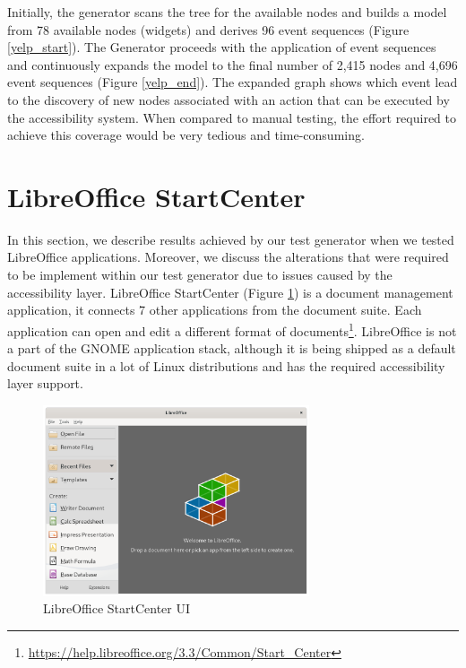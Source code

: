 Initially, the generator scans the tree for the available nodes and builds a model from 78 available nodes (widgets) and derives 96 event sequences (Figure \ref{yelp_start}). The Generator proceeds with the application of event sequences and continuously expands the model to the final number of 2,415 nodes and 4,696 event sequences (Figure \ref{yelp_end}). The expanded graph shows which event lead to the discovery of new nodes associated with an action that can be executed by the accessibility system. When compared to manual testing, the effort required to achieve this coverage would be very tedious and time-consuming. 

\section{LibreOffice StartCenter}
In this section, we describe results achieved by our test generator when we tested LibreOffice applications. Moreover, we discuss the alterations that were required to be implement within our test generator due to issues caused by the accessibility layer. 
LibreOffice StartCenter (Figure \ref{libreoffice-gui}) is a document management application, it connects 7 other applications from the document suite. Each application can open and edit a different format of documents\footnote{\url{https://help.libreoffice.org/3.3/Common/Start_Center}}. LibreOffice is not a part of the GNOME application stack, although it is being shipped as a default document suite in a lot of Linux distributions and has the required accessibility layer support.

\begin{figure}[H]
	\centering
	\includegraphics[width=0.7\textwidth,clip]{obrazky-figures/libreoffice_GUI.png}
	\caption{LibreOffice StartCenter UI}
	\label{libreoffice-gui}
\end{figure}



